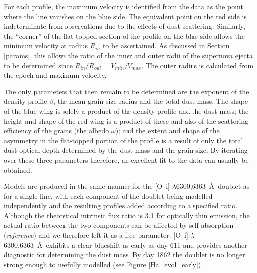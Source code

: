 For each profile, the maximum velocity is identified from the data as the 
point where the line vanishes on the blue side.  The equivalent point on 
the red side is indeterminate from observations due to the effects of 
dust scattering.  Similarly, the ``corner'' of the flat topped section of the 
profile on the blue side allows the minimum velocity at radius $R_{in}$ to be 
ascertained. As discussed in Section \ref{params}, this allows the ratio 
of the inner and outer radii of the supernova ejecta to be determined since 
$R_{in}/R_{out}=V_{min}/V_{max}$.  The outer radius is calculated from the 
epoch and maximum velocity.

The only parameters that then remain to be determined are the exponent of 
the density profile $\beta$, the mean grain size radius and the total dust mass.  The shape 
of the blue wing is solely a product of the density profile and the dust 
mass; the height and shape of the red wing is a product of these and also 
of the scattering efficiency of the grains (the albedo $\omega$); and the 
extent and shape of the asymmetry in the flat-topped portion of the 
profile is a result of only the total dust optical depth determined by the 
dust mass and the grain size.  By iterating over these three parameters 
therefore, an excellent fit to the data can usually be obtained.

Models are produced in the same manner for the [O~{\sc i}] 
$\lambda$6300,6363~\AA\ doublet as for a single line, with each component 
of the doublet being modelled independently and the resulting profiles 
added according to a specified ratio.  Although the theoretical intrinsic flux ratio 
is 3.1 for optically thin emission, the actual ratio between the two components can be 
affected by self-absorption (\textit{reference}) and we therefore 
left it as a free parameter.  [O~{\sc i}] 
$\lambda$6300,6363~\AA\ exhibits a clear blueshift as early as day 611 
and provides another diagnostic for determining the dust mass.  By day 1862 
the doublet is no longer strong enough to usefully 
modelled (see Figure \ref{Ha_evol_early}).



